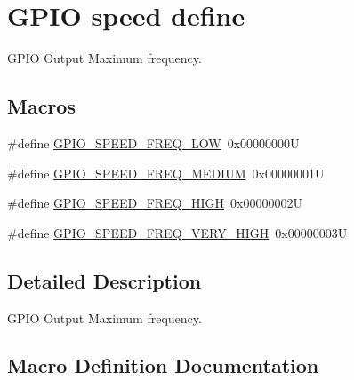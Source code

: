 \hypertarget{group___g_p_i_o__speed__define}{}\section{G\+P\+IO speed define}
\label{group___g_p_i_o__speed__define}


G\+P\+IO Output Maximum frequency.  


\subsection*{Macros}
\begin{DoxyCompactItemize}
\item 
\#define \mbox{\hyperlink{group___g_p_i_o__speed__define_gab7916c4265bfa1b26a5205ea9c1caa4e}{G\+P\+I\+O\+\_\+\+S\+P\+E\+E\+D\+\_\+\+F\+R\+E\+Q\+\_\+\+L\+OW}}~0x00000000U
\item 
\#define \mbox{\hyperlink{group___g_p_i_o__speed__define_ga1724a25a9cf00ebf485daeb09cfa1e25}{G\+P\+I\+O\+\_\+\+S\+P\+E\+E\+D\+\_\+\+F\+R\+E\+Q\+\_\+\+M\+E\+D\+I\+UM}}~0x00000001U
\item 
\#define \mbox{\hyperlink{group___g_p_i_o__speed__define_gaef5898db71cdb957cd41f940b0087af8}{G\+P\+I\+O\+\_\+\+S\+P\+E\+E\+D\+\_\+\+F\+R\+E\+Q\+\_\+\+H\+I\+GH}}~0x00000002U
\item 
\#define \mbox{\hyperlink{group___g_p_i_o__speed__define_ga1944cf10e2ab172810d38b681d40b771}{G\+P\+I\+O\+\_\+\+S\+P\+E\+E\+D\+\_\+\+F\+R\+E\+Q\+\_\+\+V\+E\+R\+Y\+\_\+\+H\+I\+GH}}~0x00000003U
\end{DoxyCompactItemize}


\subsection{Detailed Description}
G\+P\+IO Output Maximum frequency. 



\subsection{Macro Definition Documentation}
\mbox{\label{group___g_p_i_o__speed__define_gaef5898db71cdb957cd41f940b0087af8}} 
